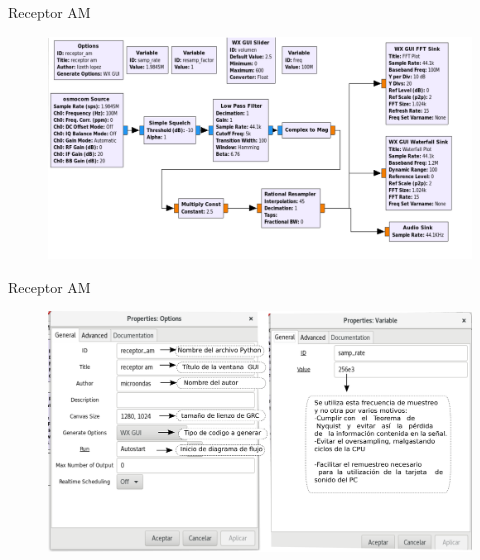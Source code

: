\begin{frame}{Receptor AM}

\begin{figure}[H]
\centering
\vspace{-3mm}
\includegraphics[width=\textwidth]{parte3/lab16/pdf/lab16_1.pdf}
\end{figure}

\end{frame}

\begin{frame}{Receptor AM}

\begin{figure}[H]
\centering
\vspace{-3mm}
\includegraphics[width=\textwidth]{parte3/lab16/pdf/lab16_2.pdf}

\end{figure}

\end{frame}

